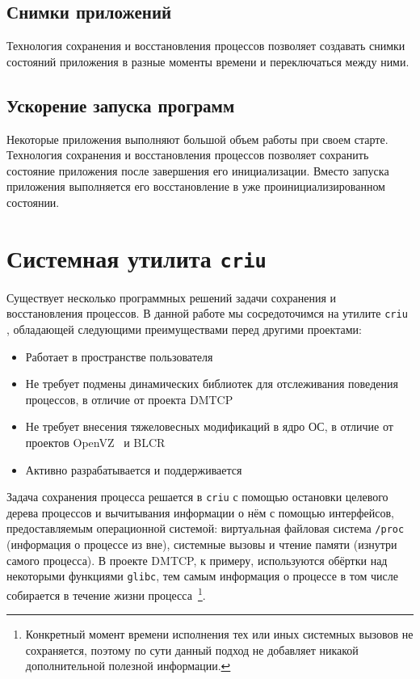 \subsection{Снимки приложений}
 
Технология сохранения и восстановления процессов позволяет создавать снимки состояний приложения в разные моменты времени и переключаться между ними. 
 
\subsection{Ускорение запуска программ}
 
Некоторые приложения выполняют большой объем работы при своем старте. Технология сохранения и восстановления процессов позволяет сохранить состояние приложения после завершения его инициализации. Вместо запуска приложения выполняется его восстановление в уже проинициализированном состоянии.

\section{Системная утилита \texttt{criu}}

Существует несколько программных решений задачи сохранения и восстановления процессов. В данной работе мы сосредоточимся на утилите \texttt{criu} \cite{url:criu}, обладающей следующими преимуществами перед другими проектами:

\begin{itemize}
	\item Работает в пространстве пользователя
	\item Не требует подмены динамических библиотек для отслеживания поведения процессов, в отличие от проекта DMTCP \cite{url:dmtcp}
	\item Не требует внесения тяжеловесных модификаций в ядро ОС, в отличие от проектов OpenVZ~\cite{url:openvz} и BLCR~\cite{url:blcr}
	\item Активно разрабатывается и поддерживается
\end{itemize}

Задача сохранения процесса решается в \texttt{criu} с помощью остановки целевого дерева процессов и вычитывания информации о нём с помощью интерфейсов, предоставляемым операционной системой: виртуальная файловая система \texttt{/proc} (информация о процессе из вне), системные вызовы и чтение памяти (изнутри самого процесса). В проекте DMTCP, к примеру, используются обёртки над некоторыми функциями \texttt{glibc}, тем самым информация о процессе в том числе собирается в течение жизни процесса~\footnote{Конкретный момент времени исполнения тех или иных системных вызовов не сохраняется, поэтому по сути данный подход не добавляет никакой дополнительной полезной информации.}.

